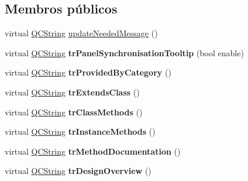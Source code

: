 \subsection*{Membros públicos}
\begin{DoxyCompactItemize}
\item 
virtual \hyperlink{class_q_c_string}{Q\-C\-String} \hyperlink{class_translator_adapter__1__8__2_aa2c053398a494e36caf5152d9a4fc6cf}{update\-Needed\-Message} ()
\item 
\hypertarget{class_translator_adapter__1__8__2_a1800c322fe577f6dfab2ab8eb463a78e}{virtual \hyperlink{class_q_c_string}{Q\-C\-String} {\bfseries tr\-Panel\-Synchronisation\-Tooltip} (bool enable)}\label{class_translator_adapter__1__8__2_a1800c322fe577f6dfab2ab8eb463a78e}

\item 
\hypertarget{class_translator_adapter__1__8__2_a48bb5cf8c4d20b9215921504ca43c8cf}{virtual \hyperlink{class_q_c_string}{Q\-C\-String} {\bfseries tr\-Provided\-By\-Category} ()}\label{class_translator_adapter__1__8__2_a48bb5cf8c4d20b9215921504ca43c8cf}

\item 
\hypertarget{class_translator_adapter__1__8__2_a943bb1d0d3cf3c3ddca3616c21f815da}{virtual \hyperlink{class_q_c_string}{Q\-C\-String} {\bfseries tr\-Extends\-Class} ()}\label{class_translator_adapter__1__8__2_a943bb1d0d3cf3c3ddca3616c21f815da}

\item 
\hypertarget{class_translator_adapter__1__8__2_a00e0dc60db9c989dad1bc310b4bdf08c}{virtual \hyperlink{class_q_c_string}{Q\-C\-String} {\bfseries tr\-Class\-Methods} ()}\label{class_translator_adapter__1__8__2_a00e0dc60db9c989dad1bc310b4bdf08c}

\item 
\hypertarget{class_translator_adapter__1__8__2_ac194051c0538db0a70504f6d11fbf9b7}{virtual \hyperlink{class_q_c_string}{Q\-C\-String} {\bfseries tr\-Instance\-Methods} ()}\label{class_translator_adapter__1__8__2_ac194051c0538db0a70504f6d11fbf9b7}

\item 
\hypertarget{class_translator_adapter__1__8__2_a4666cdb4ca29df1818744d88fc17e619}{virtual \hyperlink{class_q_c_string}{Q\-C\-String} {\bfseries tr\-Method\-Documentation} ()}\label{class_translator_adapter__1__8__2_a4666cdb4ca29df1818744d88fc17e619}

\item 
\hypertarget{class_translator_adapter__1__8__2_a5aeee72580ed889d0f0253be39800cc8}{virtual \hyperlink{class_q_c_string}{Q\-C\-String} {\bfseries tr\-Design\-Overview} ()}\label{class_translator_adapter__1__8__2_a5aeee72580ed889d0f0253be39800cc8}

\end{DoxyCompactItemize}
